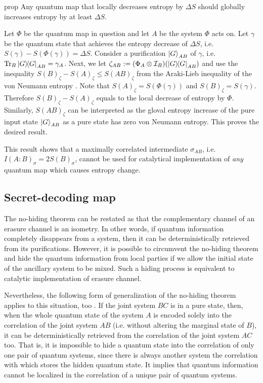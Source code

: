 \documentclass[aps, reprint, amsmath,amssymb, prx, superscriptaddress]{revtex4-2}
\begin{document}
\begin{theoremEnd}{prop}
    Any quantum map that locally decreases entropy by $\Delta S$ should globally increases entropy by at least $\Delta S$.
\end{theoremEnd}

\begin{proofEnd}
    Let $\Phi$ be the quantum map in question and let $A$ be the system $\Phi$ acts on. Let $\gamma$ be the quantum state that achieves the entropy decrease of $\Delta S$, i.e. $S(\gamma)-S(\Phi(\gamma))=\Delta S$. Consider a purification $\ket{G}_{AB}$ of $\gamma$, i.e. $\Tr_B\dyad{G}_{AB}=\gamma_A$. Next, we let $\zeta_{AB}:=(\Phi_A\otimes\mathcal{I}_B)(\dyad{G}_{AB})$ and use the inequality $S(B)_\zeta - S(A)_\zeta \leq S(AB)_\zeta$ from the Araki-Lieb inequality of the von Neumann entropy \cite{araki1970entropy}. Note that $S(A)_\zeta=S(\Phi(\gamma))$ and $S(B)_\zeta=S(\gamma)$. Therefore $S(B)_\zeta - S(A)_\zeta$ equals to the local decrease of entropy by $\Phi$. Similarly, $S(AB)_\zeta$ can be interpreted as the gloval entropy increase of the pure input state $\ket{G}_{AB}$ as a pure state has zero von Neumann entropy. This proves the desired result.
\end{proofEnd}
This result shows that a maximally correlated intermediate $\sigma_{AB}$, i.e. $I(A:B)_\sigma=2S(B)_\sigma$, cannot be used for catalytical implementation of \textit{any} quantum map which causes entropy change.

\subsection{Secret-decoding map}
The no-hiding theorem \cite{braunstein2007quantum} can be restated as that the complementary channel of an erasure channel is an isometry. In other words, if quantum information completely disappears from a system, then it can be deterministically retrieved from its purifications. However, it is possible to circumvent the no-hiding theorem and hide the quantum information from local parties if we allow the initial state of the ancillary system to be mixed. Such a hiding process is equivalent to catalytic implementation of erasure channel.

Nevertheless, the following form of generalization of the no-hiding theorem applies to this situation, too \cite{lie2019unconditionally}. If the joint system $BC$ is in a pure state, then, when the whole quantum state of the system $A$ is encoded solely into the correlation of the joint system $AB$ (i.e. without altering the marginal state of $B$), it can be deterministically retrieved from the correlation of the joint system $AC$ too. That is, it is impossible to hide a quantum state into the correlation of only one pair of quantum systems, since there is always another system the correlation with which stores the hidden quantum state. It implies that quantum information cannot be localized in the correlation of a unique pair of quantum systems.
\end{document}
